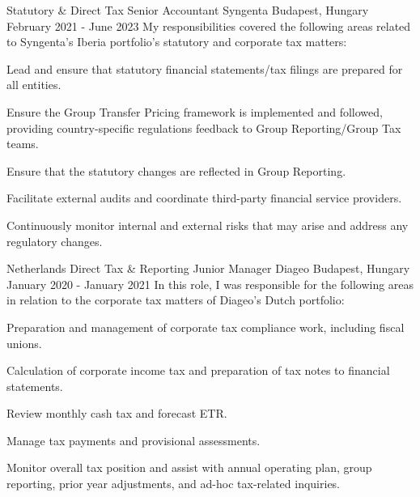 \begin{cventries}
  \cventry
    {Statutory \& Direct Tax Senior Accountant} %
    {Syngenta} %
    {Budapest, Hungary} %
    {February 2021 - June 2023} %
    {My responsibilities covered the following areas related to Syngenta's Iberia portfolio's statutory and corporate tax matters:} %
    {
      \begin{cvitems} %
        \item {Lead and ensure that statutory financial statements/tax filings are prepared for all entities.}
        \item {Ensure the Group Transfer Pricing framework is implemented and followed, providing country-specific regulations feedback to Group Reporting/Group Tax teams.}
        \item {Ensure that the statutory changes are reflected in Group Reporting.}
        \item {Facilitate external audits and coordinate third-party financial service providers.}
        \item {Continuously monitor internal and external risks that may arise and address any regulatory changes.}
      \end{cvitems}
  }


  \cventry
    {Netherlands Direct Tax \& Reporting Junior Manager} %
    {Diageo} %
    {Budapest, Hungary} %
    {January 2020 - January 2021} %
    {In this role, I was responsible for the following areas in relation to the corporate tax matters of Diageo's Dutch portfolio:} %
    {
      \begin{cvitems} %
        \item {Preparation and management of corporate tax compliance work, including fiscal unions.}
        \item {Calculation of corporate income tax and preparation of tax notes to financial statements.}
        \item {Review monthly cash tax and forecast ETR.}
        \item {Manage tax payments and provisional assessments.}
        \item {Monitor overall tax position and assist with annual operating plan, group reporting, prior year adjustments, and ad-hoc tax-related inquiries.}
      \end{cvitems}
  }


\end{cventries}
